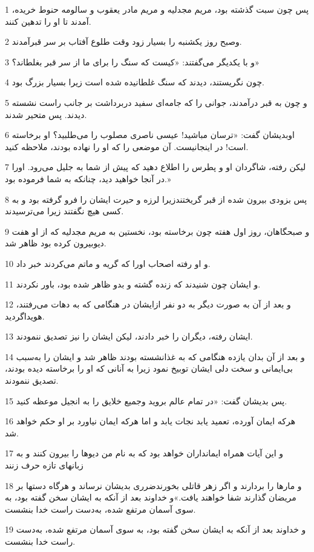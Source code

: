 \par 1 پس چون سبت گذشته بود، مریم مجدلیه و مریم مادر یعقوب و سالومه حنوط خریده، آمدند تا او را تدهین کنند.
\par 2 وصبح روز یکشنبه را بسیار زود وقت طلوع آفتاب بر سر قبر‌آمدند.
\par 3 و با یکدیگر می‌گفتند: «کیست که سنگ را برای ما از سر قبر بغلطاند؟»
\par 4 چون نگریستند، دیدند که سنگ غلطانیده شده است زیرا بسیار بزرگ بود.
\par 5 و چون به قبر درآمدند، جوانی را که جامه‌ای سفید دربرداشت بر جانب راست نشسته دیدند. پس متحیر شدند.
\par 6 اوبدیشان گفت: «ترسان مباشید! عیسی ناصری مصلوب را می‌طلبید؟ او برخاسته است! در اینجانیست. آن موضعی را که او را نهاده بودند، ملاحظه کنید.
\par 7 لیکن رفته، شاگردان او و پطرس را اطلاع دهید که پیش از شما به جلیل می‌رود. اورا در آنجا خواهید دید، چنانکه به شما فرموده بود.»
\par 8 پس بزودی بیرون شده از قبر گریختندزیرا لرزه و حیرت ایشان را فرو گرفته بود و به کسی هیچ نگفتند زیرا می‌ترسیدند.
\par 9 و صبحگاهان، روز اول هفته چون برخاسته بود، نخستین به مریم مجدلیه که از او هفت دیوبیرون کرده بود ظاهر شد.
\par 10 و او رفته اصحاب اورا که گریه و ماتم می‌کردند خبر داد.
\par 11 و ایشان چون شنیدند که زنده گشته و بدو ظاهر شده بود، باور نکردند.
\par 12 و بعد از آن به صورت دیگر به دو نفر ازایشان در هنگامی که به دهات می‌رفتند، هویداگردید.
\par 13 ایشان رفته، دیگران را خبر دادند، لیکن ایشان را نیز تصدیق ننمودند.
\par 14 و بعد از آن بدان یازده هنگامی که به غذانشسته بودند ظاهر شد و ایشان را به‌سبب بی‌ایمانی و سخت دلی ایشان توبیخ نمود زیرا به آنانی که او را برخاسته دیده بودند، تصدیق ننمودند.
\par 15 پس بدیشان گفت: «در تمام عالم بروید وجمیع خلایق را به انجیل موعظه کنید.
\par 16 هر‌که ایمان آورده، تعمید یابد نجات یابد و اما هر‌که ایمان نیاورد بر او حکم خواهد شد.
\par 17 و این آیات همراه ایمانداران خواهد بود که به نام من دیوها را بیرون کنند و به زبانهای تازه حرف زنند
\par 18 و مارها را بردارند و اگر زهر قاتلی بخورندضرری بدیشان نرساند و هرگاه دستها بر مریضان گذارند شفا خواهند یافت.»و خداوند بعد از آنکه به ایشان سخن گفته بود، به سوی آسمان مرتفع شده، به‌دست راست خدا بنشست.
\par 19 و خداوند بعد از آنکه به ایشان سخن گفته بود، به سوی آسمان مرتفع شده، به‌دست راست خدا بنشست.



